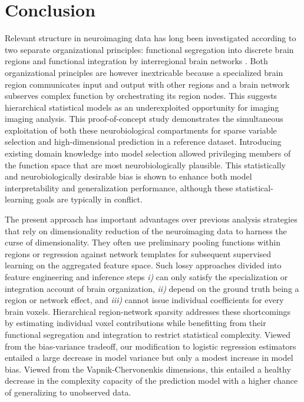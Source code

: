 \documentclass{article}
\begin{document}
\section{Conclusion}
Relevant structure in neuroimaging data has long been investigated
according to two separate organizational principles:
functional segregation into discrete brain regions
\cite{passingham2002}
and functional integration by interregional brain networks
\cite{sporns14nn}.
Both organizational principles are however inextricable because
a specialized brain region communicates input and output with other regions
and a brain network subserves complex function by
orchestrating its region nodes.
This suggests hierarchical statistical models
as an underexploited opportunity for imaging imaging analysis.
%
This proof-of-concept study demonstrates the simultaneous exploitation of
both these neurobiological compartments
for sparse variable selection and high-dimensional prediction
in a reference dataset.
%
Introducing existing domain knowledge into model selection
allowed privileging members of the function space
that are most neurobiologically plausible.
%
This statistically and neurobiologically desirable bias
is shown to enhance
both model interpretability and generalization performance,
although these statistical-learning goals are typically in conflict.



The present approach has important advantages over previous
analysis strategies that rely on dimensionality reduction of
the neuroimaging data to harness the curse of dimensionality.
They often use preliminary pooling functions within regions
or regression against network templates
for subsequent supervised learning on the aggregated feature space.
Such lossy approaches divided into feature engineering and inference steps
\textit{i)} can only satisfy the specialization or
integration account of brain organization,
\textit{ii)} depend on the ground truth being a region or network effect,
and
\textit{iii)} cannot issue individual coefficients for every brain voxels.
%
Hierarchical region-network sparsity addresses these shortcomings
by estimating individual voxel contributions
while benefitting from their functional segregation and integration
to restrict statistical complexity.
%
Viewed from the bias-variance tradeoff,
our modification to logistic regression estimators
entailed a large decrease in model variance but only a modest
increase in model bias.
Viewed from the Vapnik-Chervonenkis dimensions,
this entailed a healthy decrease in the complexity capacity of the prediction model
with a higher chance of generalizing to unobserved data.
\end{document}

